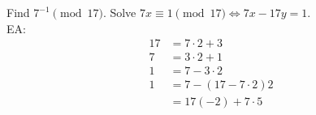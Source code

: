     \begin{example}
        Find $7^{-1}\pmod{17}$. 
        Solve $7x\equiv 1\pmod{17} \Leftrightarrow 7x-17y=1$. \\
        EA:
        \begin{align*}
            17 &= 7\cdot 2 + 3 \\
            7 &= 3\cdot 2 + 1 \\
            1 &= 7-3\cdot 2 \\ 
            1 &= 7-(17-7\cdot 2)2 \\
            &= 17(-2)+7\cdot 5
        \end{align*}
        \begin{center}\end{center}
    \end{example}

